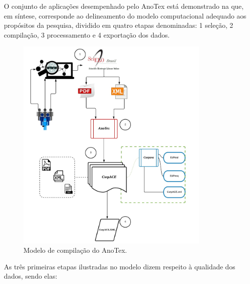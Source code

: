 \documentclass[portuguese]{textolivre}
\begin{document}
O conjunto de aplicações desempenhado pelo AnoTex está demonstrado na  que, em síntese, corresponde ao delineamento do modelo computacional adequado aos propósitos da pesquisa, dividido em quatro etapas denominadas: 1 seleção, 2 compilação, 3 processamento e 4 exportação dos dados.

\begin{figure}[htbp]
 \centering
 \includegraphics[width=0.85\textwidth]{Fig4.png}
 \caption{Modelo de compilação do AnoTex.}
 \label{fig-04}
\end{figure}

As três primeiras etapas ilustradas no modelo dizem respeito à qualidade dos dados, sendo elas:
\end{document}
